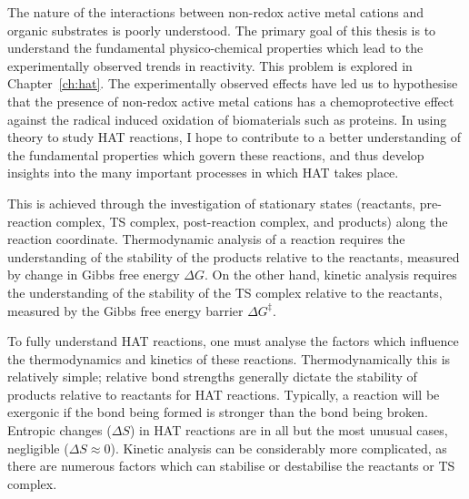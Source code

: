 The nature of the interactions between non-redox active metal cations and organic substrates is poorly understood. The primary goal of this thesis is to understand the fundamental physico-chemical properties which lead to the experimentally observed trends in reactivity. This problem is explored in Chapter~\ref{ch:hat}. The experimentally observed effects have led us to hypothesise that the presence of non-redox active metal cations has a chemoprotective effect against the radical induced oxidation of biomaterials such as proteins. In using theory to study HAT reactions, I hope to contribute to a better understanding of the fundamental properties which govern these reactions, and thus develop insights into the many important processes in which HAT takes place.

This is achieved through the investigation of stationary states (reactants, pre-reaction complex, TS complex, post-reaction complex, and products) along the reaction coordinate. Thermodynamic analysis of a reaction requires the understanding of the stability of the products relative to the reactants, measured by change in Gibbs free energy $\Delta G$. On the other hand, kinetic analysis requires the understanding of the stability of the TS complex relative to the reactants, measured by the Gibbs free energy barrier $\Delta G^{\ddagger}$.

To fully understand HAT reactions, one must analyse the factors which influence the thermodynamics and kinetics of these reactions. Thermodynamically this is relatively simple; relative bond strengths generally dictate the stability of products relative to reactants for HAT reactions. Typically, a reaction will be exergonic if the bond being formed is stronger than the bond being broken. Entropic changes ($\Delta S$) in HAT reactions are in all but the most unusual cases, negligible ($\Delta S \approx 0$).\cite{Mader2007} Kinetic analysis can be considerably more complicated, as there are numerous factors which can stabilise or destabilise the reactants or TS complex.
